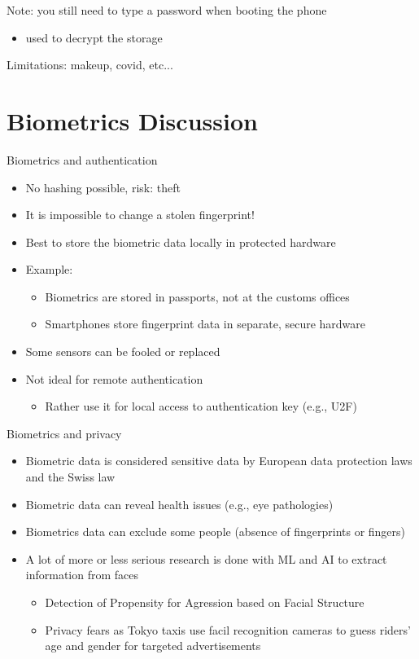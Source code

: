 \documentclass[11pt]{article}
\begin{document}
Note: you still need to type a password when booting the phone
\begin{itemize}
	\item used to decrypt the storage
\end{itemize}

Limitations: makeup, covid, etc...

\section*{Biometrics Discussion}

Biometrics and authentication
\begin{itemize}
	\item No hashing possible, risk: theft
	\item It is impossible to change a stolen fingerprint!
	\item Best to store the biometric data locally in protected hardware
	\item Example:
		\begin{itemize}
			\item Biometrics are stored in passports, not at the customs offices
			\item Smartphones store fingerprint data in separate, secure hardware
		\end{itemize}
	\item Some sensors can be fooled or replaced
	\item Not ideal for remote authentication
		\begin{itemize}
			\item Rather use it for local access to authentication key (e.g., U2F)
		\end{itemize}
\end{itemize}

Biometrics and privacy
\begin{itemize}
	\item Biometric data is considered sensitive data by European data protection laws and the Swiss law
	\item Biometric data can reveal health issues (e.g., eye pathologies)
	\item Biometrics data can exclude some people (absence of fingerprints or fingers)
	\item A lot of more or less serious research is done with ML and AI to extract information from faces
		\begin{itemize}
			\item Detection of Propensity for Agression based on Facial Structure
			\item Privacy fears as Tokyo taxis use facil recognition cameras to guess riders' age and gender for targeted advertisements
		\end{itemize}
\end{itemize}
\end{document}
